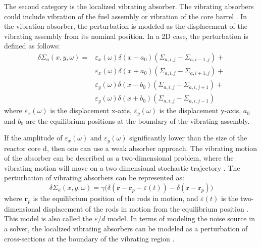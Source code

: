 The second category is the localized vibrating absorber. The vibrating absorbers could include vibration of the fuel assembly \cite{chionisSIMULATE3KAnalysesNeutron2017} or vibration of the core barrel \cite{pazsitDevelopmentsCoreBarrelMotion2016}. In the vibration absorber, the perturbation is modeled as the displacement of the vibrating assembly from its nominal position. In a 2D case, the perturbation is defined as follows:
\begin{equation}
        \begin{aligned}
                \delta \Sigma_{a} (x, y, \omega) = &\varepsilon_x (\omega) \delta(x-a_0) (\Sigma_{a,i,j} - \Sigma_{a,i-1,j}) + \\
                &\varepsilon_x (\omega) \delta(x+a_0) (\Sigma_{a,i,j} - \Sigma_{a,i+1,j}) + \\           
                &\varepsilon_y (\omega) \delta(x-b_0) (\Sigma_{a,i,j} - \Sigma_{a,i,j+1}) + \\
                &\varepsilon_y (\omega) \delta(x+b_0) (\Sigma_{a,i,j} - \Sigma_{a,i,j-1})
        \end{aligned}
\end{equation}
where $\varepsilon_x (\omega)$ is the displacement x-axis,  $\varepsilon_y (\omega)$ is the displacement y-axis, $a_0$ and $b_0$ are the equilibrium positions at the boundary of the vibrating assembly.

If the amplitude of $\varepsilon_x (\omega)$ and $\varepsilon_y (\omega)$ significantly lower than the size of the reactor core d, then one can use a weak absorber approach. The vibrating motion of the absorber can be described as a two-dimensional problem, where the vibrating motion will move on a two-dimensional stochastic trajectory \cite{pazsitInvestigationSpaceDependentNoise1977}. The perturbation of vibrating absorbers can be represented as:
\begin{equation}
        \delta \Sigma_{a} (x, y, \omega) = \gamma \biggl( \delta (\textbf{r} - \textbf{r}_p - \varepsilon(t)) - \delta (\textbf{r} - \textbf{r}_p) \biggr)
\end{equation}
where $\textbf{r}_p$ is the equilibrium position of the rods in motion, and $\varepsilon(t)$ is the two-dimensional displacement of the rods in motion from the equilibrium position \cite{pazsitNoiseTechniquesNuclear2010}. This model is also called the $\varepsilon/d$ model. In terms of modeling the noise source in a solver, the localized vibrating absorbers can be modeled as a perturbation of cross-sections at the boundary of the vibrating region \cite{mylonakisCORESIMFlexible2021}.

